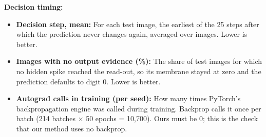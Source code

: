 \documentclass{article}
\begin{document}
{\noindent\textbf{Decision timing:}
\begin{itemize}
  \item \textbf{Decision step, mean:} For each test image, the earliest of the 25 steps after which the
    prediction never changes again, averaged over images. Lower is better.
  \item \textbf{Images with no output evidence (\%):} The share of test images for which no hidden spike reached
    the read-out, so its membrane stayed at zero and the prediction defaults to digit 0. Lower is better.
  \item \textbf{Autograd calls in training (per seed):} How many times PyTorch's backpropagation engine was
    called during training. Backprop calls it once per batch (214 batches $\times$ 50 epochs = 10,700). Ours must
    be 0; this is the check that our method uses no backprop.
\end{itemize}
}

\clearpage
\end{document}
